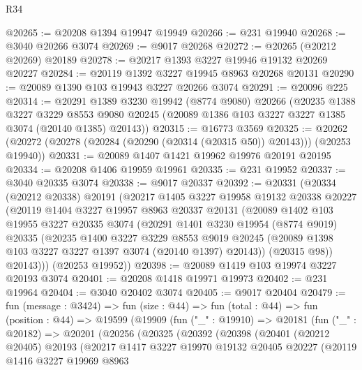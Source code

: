 \begin{lexlean}{R34}
\begin{coremodule}
@20265 := @20208 @1394 @19947 @19949
@20266 := @231 @19940
@20268 := @3040 @20266 @3074
@20269 := @9017 @20268
@20272 := @20265 (@20212 @20269) @20189
@20278 := @20217 @1393 @3227 @19946 @19132 @20269 @20227
@20284 := @20119 @1392 @3227 @19945 @8963 @20268 @20131
@20290 := @20089 @1390 @103 @19943 @3227 @20266 @3074
@20291 := @20096 @225
@20314 := @20291
    @1389
    @3230
    @19942
    (@8774 @9080)
    @20266
    (@20235
      @1388
      @3227
      @3229
      @8553
      @9080
      @20245
      (@20089 @1386 @103 @3227 @3227 @1385 @3074 (@20140 @1385) @20143))
@20315 := @16773 @3569
@20325 := @20262 (@20272 (@20278 (@20284 (@20290 (@20314 (@20315 @50)) @20143))) (@20253 @19940))
@20331 := @20089 @1407 @1421 @19962 @19976 @20191 @20195
@20334 := @20208 @1406 @19959 @19961
@20335 := @231 @19952
@20337 := @3040 @20335 @3074
@20338 := @9017 @20337
@20392 := @20331
    (@20334
      (@20212 @20338)
      @20191
      (@20217
        @1405
        @3227
        @19958
        @19132
        @20338
        @20227
        (@20119
          @1404
          @3227
          @19957
          @8963
          @20337
          @20131
          (@20089
            @1402
            @103
            @19955
            @3227
            @20335
            @3074
            (@20291
              @1401
              @3230
              @19954
              (@8774 @9019)
              @20335
              (@20235
                @1400
                @3227
                @3229
                @8553
                @9019
                @20245
                (@20089 @1398 @103 @3227 @3227 @1397 @3074 (@20140 @1397) @20143))
              (@20315 @98))
            @20143)))
      (@20253 @19952))
@20398 := @20089 @1419 @103 @19974 @3227 @20193 @3074
@20401 := @20208 @1418 @19971 @19973
@20402 := @231 @19964
@20404 := @3040 @20402 @3074
@20405 := @9017 @20404
@20479 := fun (message : @3424) =>
  fun (size : @44) =>
  fun (total : @44) =>
  fun (position : @44) =>
  @19599
    (@19909
      (fun ("_" : @19910) =>
      @20181
        (fun ("_" : @20182) =>
        @20201
          (@20256
            (@20325
              (@20392
                (@20398
                  (@20401
                    (@20212 @20405)
                    @20193
                    (@20217
                      @1417
                      @3227
                      @19970
                      @19132
                      @20405
                      @20227
                      (@20119
                        @1416
                        @3227
                        @19969
                        @8963

\end{coremodule}
\end{lexlean}
